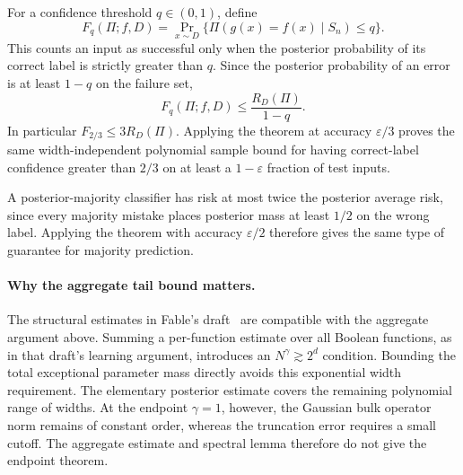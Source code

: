 For a confidence threshold $q\in(0,1)$, define
\[
 F_q(\Pi;f,D)=\Pr_{x\sim D}\{\Pi(g(x)=f(x)\mid S_n)\leq q\}.
\]
This counts an input as successful only when the posterior probability of its
correct label is strictly greater than $q$. Since the posterior probability
of an error is at least $1-q$ on the failure set,
\[
 F_q(\Pi;f,D)\leq\frac{R_D(\Pi)}{1-q}.
\]
In particular $F_{2/3}\leq3R_D(\Pi)$. Applying the theorem at accuracy
$\varepsilon/3$ proves the same width-independent polynomial sample bound
for having correct-label confidence greater than $2/3$ on at least a
$1-\varepsilon$ fraction of test inputs.

A posterior-majority classifier has risk at most twice the posterior average
risk, since every majority mistake places posterior mass at least $1/2$ on
the wrong label. Applying the theorem with accuracy $\varepsilon/2$ therefore
gives the same type of guarantee for majority prediction.

\paragraph{Why the aggregate tail bound matters.}
The structural estimates in Fable's draft~\cite{fable} are compatible with
the aggregate argument above. Summing a per-function estimate over all
Boolean functions, as in that draft's learning argument, introduces an
$N^\gamma\gtrsim2^d$ condition. Bounding the total exceptional parameter
mass directly avoids this exponential width requirement. The elementary
posterior estimate covers the remaining polynomial range of widths.
At the endpoint $\gamma=1$, however, the Gaussian bulk operator norm
remains of constant order, whereas the truncation error requires a small
cutoff. The aggregate estimate and spectral lemma therefore do not give
the endpoint theorem.
